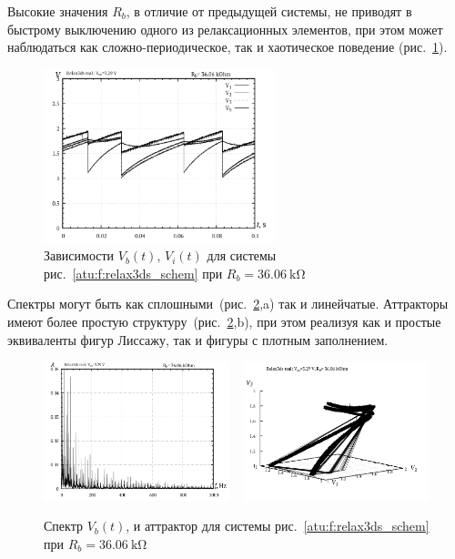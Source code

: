 Высокие значения $R_b$, в отличие от предыдущей системы,
не приводят в быстрому выключению одного из релаксационных
элементов, при этом может наблюдаться как сложно-периодическое,
так и хаотическое поведение
(рис.~\ref{atu:f:relax3ds_t_36060}).

\begin{figure}[htb!]
  \centerline{\includegraphics[width=0.6\textwidth]{p/relax3ds_t_036060.png} }
  \caption{Зависимости $V_b(t)$, $V_i(t)$ для системы рис.~\ref{atu:f:relax3ds_schem} при $R_b=\SI{36.06}{\kilo\ohm}$ }
  \label{atu:f:relax3ds_t_36060}
\end{figure}

Спектры могут быть как сплошными~(рис.~\ref{atu:f:relax3ds_f_36060},a)
так и линейчатые.
Аттракторы имеют более простую структуру~(рис.~\ref{atu:f:relax3ds_f_36060},b),
при этом реализуя как и простые эквиваленты фигур Лиссажу,
так и фигуры с плотным заполнением.

\begin{figure}[htb!]
  \centerline{
    \includegraphics[width=0.48\textwidth]{p/relax3ds_f_036060.png}
    ~
    \includegraphics[width=0.48\textwidth]{p/relax3ds_v1v2v3_036060.png}
  }
  \caption{Спектр $V_b(t)$, и аттрактор для системы рис.~\ref{atu:f:relax3ds_schem} при $R_b=\SI{36.06}{\kilo\ohm}$ }
  \label{atu:f:relax3ds_f_36060}
\end{figure}


